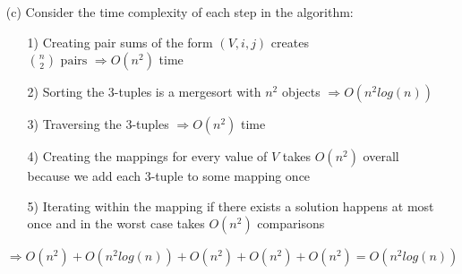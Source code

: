 \documentclass[12pt]{article}
\newtheorem{theorem}{Theorem}
\newcommand{\nextline}{\\[0.2em]}
\newcommand{\st}{\text{ s.t }}
\newcommand{\tand}{\text{ and }}
\begin{document}
\begin{enumerate}
\begin{theorem}
  There exists a solution $\iff$ the algorithm finds a solution
\end{theorem}
\begin{proof} $\nextline$
  ($\Rightarrow$)
    Assume $\exists x_i, x_j, x_k, x_l \st x_i + x_j + x_k + x_l = S$ and  $i, j, k, l$ are all distinct indices. By Step (1) in our algorithm, $\exists V_1= x_i + x_j \tand V_2 = x_k + x_l$. $\nextline$
    Our pointers start out at $V_L = \min{V} \tand V_R = \max{V}$. By the step (2), the $V$-values in sorted increasing order and therefore, by the standard implementaion of the two-pointer algorithm on a sorted array, the procedure finds a pair of values summing to $S$ iff such a pair exists. Since $V_1+V_2=S$, the two-pointer will reach a step with $(V_L,V_R)=(V_1,V_2)$ if the algorithm has yet to terminate. $\nextline$
    Note that any solution found by the two may not be $V_1, V_2$ and so we will proceed with some arbitrary values $V_L, V_R$. $\nextline$
    Within $V_L, V_R$, there are two possibilities: $\exists$ two disjoint pairs or $\nexists$ exists two disjoint pairs. If the disjoint pairs exist, by Lemma 1, the algorithm will find it and the proof ends trivially. If the disjoint pairs do not exist, we continue incrementing and deincrementing the pointers, discarding both the current $V_L, V_R$. 
    $\nextline$
    We will either land on some $V_L, V_R$ which contains two disjoint pairs and algorithm terminates and returns a solution, or we will land on $V_1, V_2$ and because it is guarenteed to contain two disjoint pairs in $V_1 \tand V_2$, by Lemma 1, the algorithm terminates and returns a solution.

  ($\Leftarrow$) Assume the algorithm finds a solution. By Step (3) of our algorithm, it means that ours pointers found some $V_L, V_R \st V_L + V_R = S$. By Lemma 1, there exist $(V_L,i,j)\in L$ and $(V_R,k,l)\in R \st \{i,j\}\cap\{k,l\}=\varnothing$. Therefore $x_i + x_j + x_k + x_l = V_L + V_R = S$
\end{proof}

\item[(c)] Consider the time complexity of each step in the algorithm:
\begin{enumerate}
  \item[1)] Creating pair sums of the form $(V, i, j)$ creates $\binom{n}{2} \text{ pairs } \Rightarrow O(n^2)$ time
  \item[2)] Sorting the 3-tuples is a mergesort with $n^2$ objects $\Rightarrow O(n^2log(n))$
  \item[3)] Traversing the 3-tuples $\Rightarrow O(n^2)$ time
  \item[4)] Creating the mappings for every value of $V$ takes $O(n^2)$ overall because we add each 3-tuple to some mapping once
  \item[5)] Iterating within the mapping if there exists a solution happens at most once and in the worst case takes $O(n^2)$ comparisons
\end{enumerate}
$\Rightarrow O(n^2) +O(n^2log(n)) + O(n^2) + O(n^2) + O(n^2) = O(n^2log(n))$
\end{enumerate}
\end{document}
